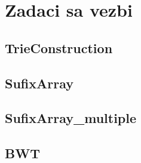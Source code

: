 \section{Zadaci sa vezbi}

\setexamplecodestyle
\subsection{TrieConstruction}


\subsection{SufixArray}


\subsection{SufixArray_multiple}


\subsection{BWT}

